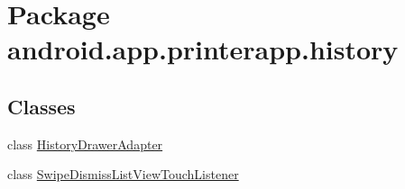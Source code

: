 \hypertarget{namespaceandroid_1_1app_1_1printerapp_1_1history}{}\section{Package android.\+app.\+printerapp.\+history}
\label{namespaceandroid_1_1app_1_1printerapp_1_1history}
\subsection*{Classes}
\begin{DoxyCompactItemize}
\item 
class \hyperlink{classandroid_1_1app_1_1printerapp_1_1history_1_1_history_drawer_adapter}{History\+Drawer\+Adapter}
\item 
class \hyperlink{classandroid_1_1app_1_1printerapp_1_1history_1_1_swipe_dismiss_list_view_touch_listener}{Swipe\+Dismiss\+List\+View\+Touch\+Listener}
\end{DoxyCompactItemize}

